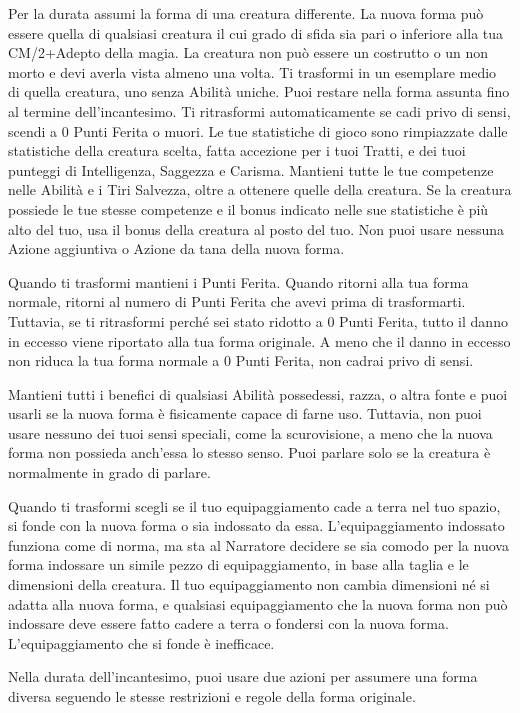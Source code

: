 \begin{multicols}{2}
Per la durata assumi la forma di una creatura differente. La nuova forma può essere quella di qualsiasi creatura il cui grado di sfida sia pari o inferiore alla tua CM/2+Adepto della magia. La creatura non può essere un costrutto o un non morto e devi averla vista almeno una volta. Ti trasformi in un esemplare medio di quella creatura, uno senza Abilità uniche. Puoi restare nella forma assunta fino al termine dell'incantesimo. Ti ritrasformi automaticamente se cadi privo di sensi, scendi a 0 Punti Ferita o muori. Le tue statistiche di gioco sono rimpiazzate dalle statistiche della creatura scelta, fatta accezione per i tuoi Tratti, e dei tuoi punteggi di Intelligenza, Saggezza e Carisma. Mantieni tutte le tue competenze nelle Abilità e i Tiri Salvezza, oltre a ottenere quelle della creatura. Se la creatura possiede le tue stesse competenze e il bonus indicato nelle sue statistiche è più alto del tuo, usa il bonus della creatura al posto del tuo. Non puoi usare nessuna Azione aggiuntiva o Azione da tana della nuova forma.

Quando ti trasformi mantieni i Punti Ferita. Quando ritorni alla tua forma normale, ritorni al numero di Punti Ferita che avevi prima di trasformarti. Tuttavia, se ti ritrasformi perché sei stato ridotto a 0 Punti Ferita, tutto il danno in eccesso viene riportato alla tua forma originale. A meno che il danno in eccesso non riduca la tua forma normale a 0 Punti Ferita, non cadrai privo di sensi.

Mantieni tutti i benefici di qualsiasi Abilità possedessi, razza, o altra fonte e puoi usarli se la nuova forma è fisicamente capace di farne uso. Tuttavia, non puoi usare nessuno dei tuoi sensi speciali, come la scurovisione, a meno che la nuova forma non possieda anch'essa lo stesso senso. Puoi parlare solo se la creatura è normalmente in grado di parlare.

Quando ti trasformi scegli se il tuo equipaggiamento cade a terra nel tuo spazio, si fonde con la nuova forma o sia indossato da essa. L'equipaggiamento indossato funziona come di norma, ma sta al Narratore decidere se sia comodo per la nuova forma indossare un simile pezzo di equipaggiamento, in base alla taglia e le dimensioni della creatura. Il tuo equipaggiamento non cambia dimensioni né si adatta alla nuova forma, e qualsiasi equipaggiamento che la nuova forma non può indossare deve essere fatto cadere a terra o fondersi con la nuova forma. L'equipaggiamento che si fonde è inefficace.

Nella durata dell'incantesimo, puoi usare due azioni per assumere una forma diversa seguendo le stesse restrizioni e regole della forma originale.


\end{multicols}
